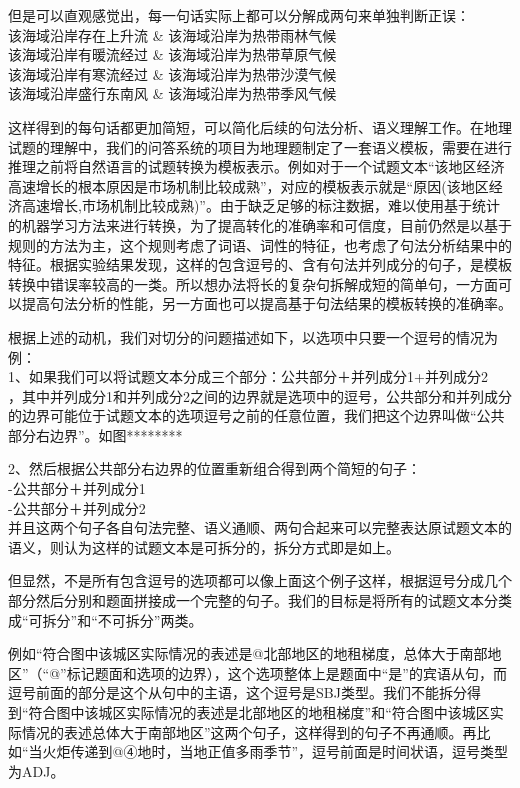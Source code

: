 \documentclass[master, winfont]{njuthesis}
\begin{document}
但是可以直观感觉出，每一句话实际上都可以分解成两句来单独判断正误：\\
该海域沿岸存在上升流 \& 该海域沿岸为热带雨林气候\\
该海域沿岸有暖流经过 \& 该海域沿岸为热带草原气候\\
该海域沿岸有寒流经过 \& 该海域沿岸为热带沙漠气候\\
该海域沿岸盛行东南风 \& 该海域沿岸为热带季风气候

这样得到的每句话都更加简短，可以简化后续的句法分析、语义理解工作。在地理试题的理解中，我们的问答系统的项目为地理题制定了一套语义模板，需要在进行推理之前将自然语言的试题转换为模板表示。例如对于一个试题文本“该地区经济高速增长的根本原因是市场机制比较成熟”，对应的模板表示就是“原因(该地区经济高速增长,市场机制比较成熟)”。由于缺乏足够的标注数据，难以使用基于统计的机器学习方法来进行转换，为了提高转化的准确率和可信度，目前仍然是以基于规则的方法为主，这个规则考虑了词语、词性的特征，也考虑了句法分析结果中的特征。根据实验结果发现，这样的包含逗号的、含有句法并列成分的句子，是模板转换中错误率较高的一类。所以想办法将长的复杂句拆解成短的简单句，一方面可以提高句法分析的性能，另一方面也可以提高基于句法结果的模板转换的准确率。

根据上述的动机，我们对切分的问题描述如下，以选项中只要一个逗号的情况为例：\\
1、如果我们可以将试题文本分成三个部分：公共部分＋并列成分1+并列成分2\\，其中并列成分1和并列成分2之间的边界就是选项中的逗号，公共部分和并列成分的边界可能位于试题文本的选项逗号之前的任意位置，我们把这个边界叫做“公共部分右边界”。如图********

2、然后根据公共部分右边界的位置重新组合得到两个简短的句子：\\
-公共部分＋并列成分1\\
-公共部分＋并列成分2\\
并且这两个句子各自句法完整、语义通顺、两句合起来可以完整表达原试题文本的语义，则认为这样的试题文本是可拆分的，拆分方式即是如上。

但显然，不是所有包含逗号的选项都可以像上面这个例子这样，根据逗号分成几个部分然后分别和题面拼接成一个完整的句子。我们的目标是将所有的试题文本分类成“可拆分”和“不可拆分”两类。

例如“符合图中该城区实际情况的表述是@北部地区的地租梯度，总体大于南部地区”（“@”标记题面和选项的边界），这个选项整体上是题面中“是”的宾语从句，而逗号前面的部分是这个从句中的主语，这个逗号是SBJ类型。我们不能拆分得到“符合图中该城区实际情况的表述是北部地区的地租梯度”和“符合图中该城区实际情况的表述总体大于南部地区”这两个句子，这样得到的句子不再通顺。再比如“当火炬传递到@④地时，当地正值多雨季节”，逗号前面是时间状语，逗号类型为ADJ。
\end{document}
